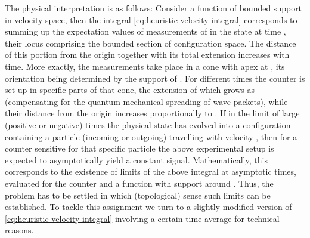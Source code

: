 \documentclass[a4paper,a4paper]{article}
\numberwithin{equation}{section}
\providecommand{\vib}{\mathib{v}}
\providecommand{\Vsf}{\mathsf{V}}
\providecommand{\Rs}{\mathbb{R}^s}
\theoremstyle{definition}
\theoremstyle{plain}
\theoremstyle{remark}
\providecommand{\set}[1]{\{ #1 \}}
\providecommand{\abs}[1]{\lvert #1 \rvert}
\begin{document}
  The physical interpretation is as follows: Consider a function \coordHE{}
  of bounded support \myHighlight{$\Vsf \subseteq \Rs \setminus \set{0}$}\coordHE{} in
  velocity space, then the integral
  \eqref{eq:heuristic-velocity-integral} corresponds to summing up the
  expectation values of measurements of \coordHE{} in the state \myHighlight{$\omega$}\coordHE{} at
  time \myHighlight{$\tau$}\coordHE{}, their locus comprising the bounded section \myHighlight{$\tau \cdot
  \Vsf$}\coordHE{} of configuration space. The distance of this portion from the
  origin together with its total extension increases with time. More
  exactly, the measurements take place in a cone with apex at \coordHE{}, its
  orientation being determined by the support of \coordHE{}. For different
  times \myHighlight{$\tau$}\coordHE{} the counter \coordHE{} is set up in specific parts of that
  cone, the extension of which grows as \myHighlight{$\abs{\tau}^{s}$}\coordHE{} (compensating
  for the quantum mechanical spreading of wave packets), while their
  distance from the origin increases proportionally to \myHighlight{$\abs{\tau}$}\coordHE{}.
  If in the limit of large (positive or negative) times the physical
  state \myHighlight{$\omega$}\coordHE{} has evolved into a configuration containing a
  particle (incoming or outgoing) travelling with velocity \myHighlight{$\vib_0 \in
  \Vsf$}\coordHE{}, then for a counter \coordHE{} sensitive for that specific
  particle the above experimental setup is expected to asymptotically
  yield a constant signal. Mathematically, this corresponds to the
  existence of limits of the above integral at asymptotic times,
  evaluated for the counter \coordHE{} and a function \coordHE{} with support
  around \myHighlight{$\vib_0$}\coordHE{}.  Thus, the problem has to be settled in which
  (topological) sense such limits can be established. To tackle this
  assignment we turn to a slightly modified version of
  \eqref{eq:heuristic-velocity-integral} involving a certain time
  average for technical reasons.
\end{document}
